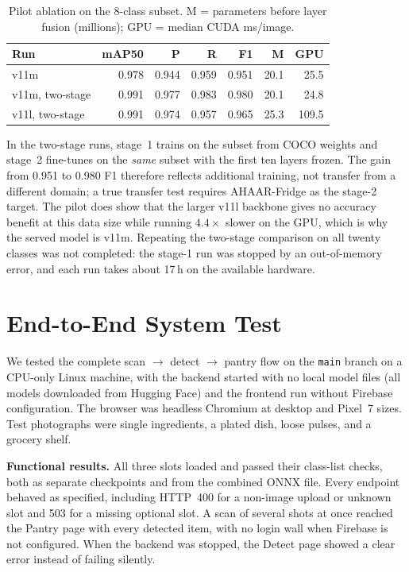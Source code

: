 \documentclass[journal]{IEEEtran}
\begin{document}
\begin{table}[!tb]
\caption{Pilot ablation on the 8-class subset. M = parameters before layer fusion
(millions); GPU = median CUDA ms/image.}
\label{tab:pilot}
\centering
\scriptsize
\setlength{\tabcolsep}{2.5pt}
\begin{tabular}{lrrrrrr}
\toprule
\textbf{Run} & \textbf{mAP50} & \textbf{P} & \textbf{R} & \textbf{F1} & \textbf{M} & \textbf{GPU} \\
\midrule
v11m             & 0.978 & 0.944 & 0.959 & 0.951 & 20.1 & 25.5 \\
v11m, two-stage  & 0.991 & 0.977 & 0.983 & 0.980 & 20.1 & 24.8 \\
v11l, two-stage  & 0.991 & 0.974 & 0.957 & 0.965 & 25.3 & 109.5 \\
\bottomrule
\end{tabular}
\end{table}

In the two-stage runs, stage~1 trains on the subset from COCO
weights and stage~2 fine-tunes on the \emph{same} subset with the
first ten layers frozen. The gain from 0.951 to 0.980 F1 therefore
reflects additional training, not transfer from a different
domain; a true transfer test requires AHAAR-Fridge as the stage-2
target. The pilot does show that the larger v11l backbone gives no
accuracy benefit at this data size while running $4.4\times$ slower
on the GPU, which is why the served model is v11m. Repeating the
two-stage comparison on all twenty classes was not completed: the
stage-1 run was stopped by an out-of-memory error, and each run takes
about 17\,h on the available hardware.


\section{End-to-End System Test}
\label{sec:e2e}

We tested the complete scan $\rightarrow$ detect $\rightarrow$ pantry
flow on the \texttt{main} branch on a CPU-only Linux machine, with
the backend started with no local model files (all models downloaded
from Hugging Face) and the frontend run without Firebase
configuration. The browser was headless Chromium at desktop and
Pixel~7 sizes. Test photographs were single ingredients, a plated
dish, loose pulses, and a grocery shelf.

\textbf{Functional results.} All three slots loaded and passed their
class-list checks, both as separate checkpoints and from the combined
ONNX file. Every endpoint behaved as specified, including HTTP~400
for a non-image upload or unknown slot and 503 for a missing optional
slot. A scan of several shots at once reached the Pantry page with
every detected item, with no login wall when Firebase is not
configured. When the backend was stopped, the Detect page showed a
clear error instead of failing silently.
\end{document}

